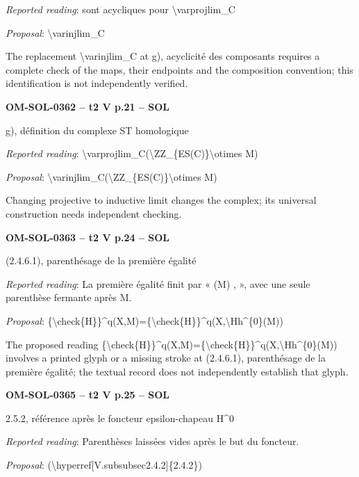 \emph{Reported reading}: sont acycliques pour \textbackslash{}varprojlim\_C\par
\emph{Proposal}: \textbackslash{}varinjlim\_C\par
The replacement \textbackslash{}varinjlim\_C at g), acyclicité des composants requires a complete check of the maps, their endpoints and the composition convention; this identification is not independently verified.\par
\par\noindent\textbf{OM-SOL-0362 -- t2 V p.21 -- SOL}\par
g), définition du complexe ST homologique\par
\emph{Reported reading}: \textbackslash{}varprojlim\_C(\textbackslash{}ZZ\_\{ES(C)\}\textbackslash{}otimes M)\par
\emph{Proposal}: \textbackslash{}varinjlim\_C(\textbackslash{}ZZ\_\{ES(C)\}\textbackslash{}otimes M)\par
Changing projective to inductive limit changes the complex; its universal construction needs independent checking.\par
\par\noindent\textbf{OM-SOL-0363 -- t2 V p.24 -- SOL}\par
(2.4.6.1), parenthésage de la première égalité\par
\emph{Reported reading}: La première égalité finit par « (M) , », avec une seule parenthèse fermante après M.\par
\emph{Proposal}: \{\textbackslash{}check\{H\}\}\textasciicircum{}q(X,M)=\allowbreak \{\textbackslash{}check\{H\}\}\textasciicircum{}q(X,\textbackslash{}Hh\textasciicircum{}\{0\}(M))\par
The proposed reading \{\textbackslash{}check\{H\}\}\textasciicircum{}q(X,M)=\allowbreak \{\textbackslash{}check\{H\}\}\textasciicircum{}q(X,\textbackslash{}Hh\textasciicircum{}\{0\}(M)) involves a printed glyph or a missing stroke at (2.4.6.1), parenthésage de la première égalité; the textual record does not independently establish that glyph.\par
\par\noindent\textbf{OM-SOL-0365 -- t2 V p.25 -- SOL}\par
2.5.2, référence après le foncteur epsilon-chapeau H\textasciicircum{}0\par
\emph{Reported reading}: Parenthèses laissées vides après le but du foncteur.\par
\emph{Proposal}: (\textbackslash{}hyperref[V.subsubsec2.4.2]\{2.4.2\})\par
